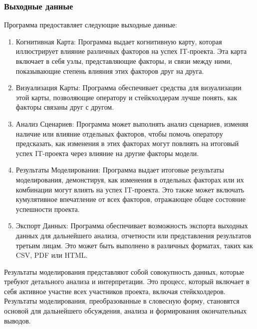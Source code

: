 \documentclass{article}
\begin{document}
    \subsubsection{Выходные данные}
    Программа предоставляет следующие выходные данные:\\
    \begin{enumerate}
        \item  Когнитивная Карта: Программа выдает когнитивную карту, которая иллюстрирует влияние различных факторов на успех IT-проекта. Эта карта включает в себя узлы, представляющие факторы, и связи между ними, показывающие степень влияния этих факторов друг на друга.
        \item  Визуализация Карты: Программа обеспечивает средства для визуализации этой карты, позволяющие оператору и стейкхолдерам лучше понять, как факторы связаны друг с другом.
        \item  Анализ Сценариев: Программа может выполнять анализ сценариев, изменяя наличие или влияние отдельных факторов, чтобы помочь оператору предсказать, как изменения в этих факторах могут повлиять на итоговый успех IT-проекта через влияние на другие факторы модели.
        \item  Результаты Моделирования: Программа выдает итоговые результаты моделирования, демонстируя, как изменения в отдельных факторах или их комбинации могут влиять на успех IT-проекта. Это также может включать кумулятивное впечатление от всех факторов, отражающее общее состояние успешности проекта.
        \item  Экспорт Данных: Программа обеспечивает возможность экспорта выходных данных для дальнейшего анализа, отчетности или представления результатов третьим лицам. Это может быть выполнено в различных форматах, таких как CSV, PDF или HTML.
    \end{enumerate}
    Результаты моделирования представляют собой совокупность данных, которые требуют детального анализа и интерпретации. Это процесс, который включает в себя активное участие всех участников проекта, включая стейкхолдеров. Результаты моделирования, преобразованные в словесную форму, становятся основой для дальнейшего обсуждения, анализа и формирования окончательных выводов.\\
\end{document}
